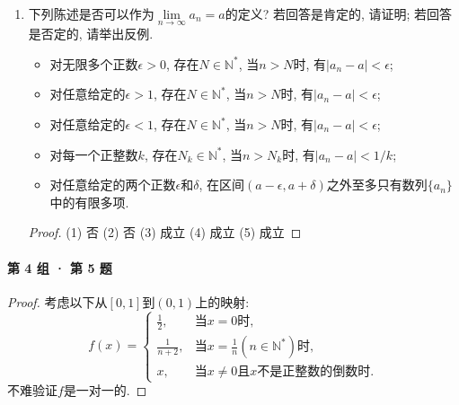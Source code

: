 \documentclass[UTF8,11pt, a4paper, oneside, fontset=none]{ctexbook}
\begin{document}
\begin{enumerate}
\begin{proof}
根据确界原理, 设$\xi = \inf S, \eta = \sup S$. 若$\xi = \eta$, 则$S$为单元素集, 结论显然成立. 设$\xi < \eta$.(为什么下确界一定小于上确界?) 考虑集合$E = \{|x-y| \ |x, y \in S \}$, 则要证的是
\[
\sup E = \eta - \xi.
\]
首先, $\forall x, y \in S$, 有
\[
x \leq \eta, y \geq \xi \Rightarrow |x - y| \leq \eta - \xi,
\]
这说明$\eta - \xi$是一个上界. 又因为$\forall \epsilon>0$, $\eta-\frac{\epsilon}{2}$不再是$S$的上界, $\xi + \frac{\epsilon}{2}$不再是$S$的下界. 因此$\exists x_0, y_0 \in S$, 使得
\[
x_0 > \eta-\frac{\epsilon}{2}, y_0 < \xi + \frac{\epsilon}{2} \Rightarrow |x_0 - y_0| \geq (\eta - \xi) -\epsilon.
\]
即证.
\end{proof}


\item 下列陈述是否可以作为$\lim\limits_{n \to \infty} a_n = a$的定义? 若回答是肯定的, 请证明; 若回答是否定的, 请举出反例.

\begin{itemize}
\item[(1)] 对无限多个正数$\epsilon>0$, 存在$N \in \mathbb N^*$, 当$n >N$时, 有$|a_n - a|< \epsilon$;
\item[(2)] 对任意给定的$\epsilon >1$, 存在$N \in \mathbb N^*$, 当$n >N$时, 有$|a_n - a|< \epsilon$;
\item[(3)] 对任意给定的$\epsilon <1$, 存在$N \in \mathbb N^*$, 当$n >N$时, 有$|a_n - a|< \epsilon$;
\item[(4)] 对每一个正整数$k$, 存在$N_k \in \mathbb N^*$, 当$n >N_k$时, 有$|a_n - a|< 1/k$;
\item[(5)] 对任意给定的两个正数$\epsilon$和$\delta$, 在区间$(a-\epsilon, a+\delta)$之外至多只有数列$\{ a_n \}$中的有限多项.
\end{itemize}


\begin{proof}


(1) 否 (2) 否 (3) 成立 (4) 成立 (5) 成立


\end{proof}


\end{enumerate}

\paragraph{第 4 组 · 第 5 题}
\begin{proof}
考虑以下从$[0, 1]$到$(0, 1)$上的映射:
\[
f(x) = \begin{cases}
\frac{1}{2}, &\mbox{当$x=0$时},\\
\frac{1}{n+2}, &\mbox{当$x = \frac{1}{n}(n \in \mathbb N^*)$时},\\
x, &\mbox{当$x \neq 0$且$x$不是正整数的倒数时}.
\end{cases}
\]
不难验证$f$是一对一的.
\end{proof}
\end{document}
